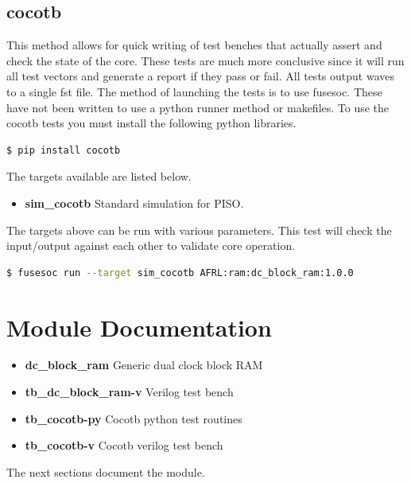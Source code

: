 \subsection{cocotb}
\par
This method allows for quick writing of test benches that actually assert and check the state of the core.
These tests are much more conclusive since it will run all test vectors and generate a report if they
pass or fail. All tests output waves to a single fst file. The method of launching the tests is to use
fusesoc. These have not been written to use a python runner method or makefiles.
To use the cocotb tests you must install the following python libraries.
\begin{lstlisting}[language=bash]
  $ pip install cocotb
\end{lstlisting}

The targets available are listed below.
\begin{itemize}
  \item \textbf{sim\_cocotb} Standard simulation for PISO.
\end{itemize}

The targets above can be run with various parameters.
This test will check the input/output against each other to validate core operation.
\begin{lstlisting}[language=bash]
  $ fusesoc run --target sim_cocotb AFRL:ram:dc_block_ram:1.0.0
\end{lstlisting}

\newpage

\section{Module Documentation} \label{Module Documentation}

\begin{itemize}
\item \textbf{dc\_block\_ram} Generic dual clock block RAM\\
\item \textbf{tb\_dc\_block\_ram-v} Verilog test bench\\
\item \textbf{tb\_cocotb-py} Cocotb python test routines\\
\item \textbf{tb\_cocotb-v} Cocotb verilog test bench\\
\end{itemize}
The next sections document the module.

